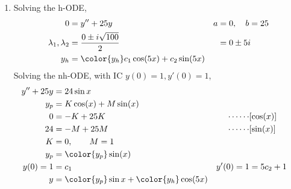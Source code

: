 \begin{enumerate}
    \item Solving the h-ODE,
          \begin{align}
              0                        & = y'' + 25y                                 & a & = 0, \quad b = 25 \\
              \lambda_{1}, \lambda_{2} & = \frac{0 \pm i\sqrt{100}}{2}               &   & = 0 \pm 5i        \\
              y_{h}                    & = \color{y_h} c_{1}\cos(5x) + c_{2}\sin(5x)
          \end{align}
          Solving the nh-ODE, with IC $ y(0) = 1, y'(0) = 1 $,
          \begin{align}
              y'' + 25y & = 24\sin x                                                                    \\
              y_{p}     & = K \cos(x) + M \sin(x)                                                       \\
              0         & = -K + 25K                                      & \cdots\cdots & [\cos(x)]    \\
              24        & = -M + 25M                                      & \cdots\cdots & [\sin(x)]    \\
              K         & = 0, \qquad M = 1                                                             \\
              y_{p}     & = \color{y_p} \sin(x)                                                         \\
              y(0) = 1  & = c_{1}                                         & y'(0) = 1    & = 5c_{2} + 1 \\
              y         & = {\color{y_p} \sin x} + {\color{y_h} \cos(5x)}
          \end{align}

          \begin{figure}[H]
              \centering
          \end{figure}


\end{enumerate}
